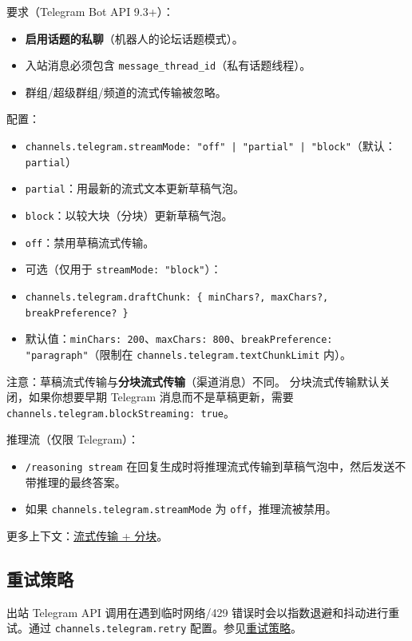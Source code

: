 要求（Telegram Bot API 9.3+）：

\begin{itemize}
  \item \textbf{启用话题的私聊}（机器人的论坛话题模式）。
  \item 入站消息必须包含 \texttt{message\_thread\_id}（私有话题线程）。
  \item 群组/超级群组/频道的流式传输被忽略。
\end{itemize}


配置：

\begin{itemize}
  \item \texttt{channels.telegram.streamMode: "off" | "partial" | "block"}（默认：\texttt{partial}）
  \item \texttt{partial}：用最新的流式文本更新草稿气泡。
  \item \texttt{block}：以较大块（分块）更新草稿气泡。
  \item \texttt{off}：禁用草稿流式传输。
  \item 可选（仅用于 \texttt{streamMode: "block"}）：
  \item \texttt{channels.telegram.draftChunk: \{ minChars?, maxChars?, breakPreference? \}}
  \item 默认值：\texttt{minChars: 200}、\texttt{maxChars: 800}、\texttt{breakPreference: "paragraph"}（限制在 \texttt{channels.telegram.textChunkLimit} 内）。
\end{itemize}


注意：草稿流式传输与\textbf{分块流式传输}（渠道消息）不同。
分块流式传输默认关闭，如果你想要早期 Telegram 消息而不是草稿更新，需要 \texttt{channels.telegram.blockStreaming: true}。

推理流（仅限 Telegram）：

\begin{itemize}
  \item \texttt{/reasoning stream} 在回复生成时将推理流式传输到草稿气泡中，然后发送不带推理的最终答案。
  \item 如果 \texttt{channels.telegram.streamMode} 为 \texttt{off}，推理流被禁用。
\end{itemize}

更多上下文：\href{/concepts/streaming}{流式传输 + 分块}。

\subsection{重试策略}


出站 Telegram API 调用在遇到临时网络/429 错误时会以指数退避和抖动进行重试。通过 \texttt{channels.telegram.retry} 配置。参见\href{/concepts/retry}{重试策略}。

